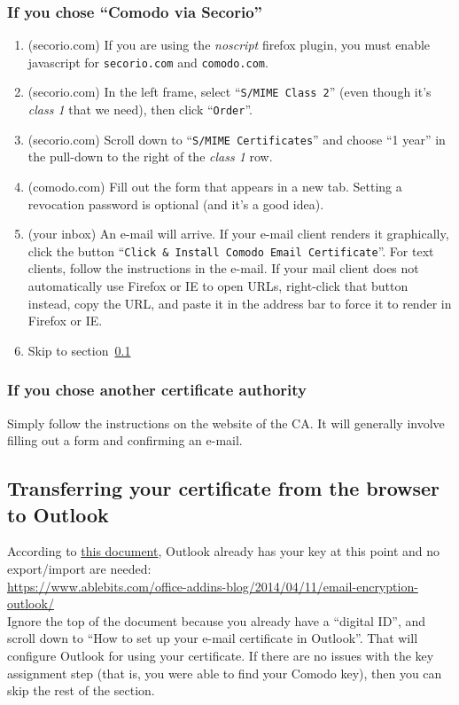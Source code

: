 \documentclass[pdftex,12pt,titlepage=false]{scrartcl}
\begin{document}
\subsubsection{If you chose ``Comodo via Secorio''}
\begin{multicols}{2}
  \begin{enumerate}
  \item (secorio.com) If you are using the \emph{noscript} firefox
    plugin, you must enable javascript for \texttt{secorio.com} and
    \texttt{comodo.com}.
  \item (secorio.com) In the left frame, select ``\texttt{S/MIME Class
      2}'' (even though it's \emph{class 1} that we need), then click
    ``\texttt{Order}''.
  \item (secorio.com) Scroll down to ``\texttt{S/MIME Certificates}''
    and choose ``1 year'' in the pull-down to the right of the
    \emph{class 1} row.
  \item (comodo.com) Fill out the form that appears in a new tab.
    Setting a revocation password is optional (and it's a good
    idea).%
  \item (your inbox) An e-mail will arrive.  If your e-mail client
    renders it graphically, click the button ``\texttt{Click \&
      Install Comodo Email Certificate}''.  For text clients, follow
    the instructions in the e-mail.  If your mail client does not
    automatically use Firefox or IE to open URLs, right-click that
    button instead, copy the URL, and paste it in the address bar to
    force it to render in Firefox or IE.
  \item Skip to section~\ref{browser_export}
  \end{enumerate}
\end{multicols}

\subsubsection{If you chose another certificate authority}
Simply follow the instructions on the website of the CA.  It will
generally involve filling out a form and confirming an e-mail.

\subsection{Transferring your certificate from the browser to Outlook}\label{browser_export}

According to
\href{https://www.ablebits.com/office-addins-blog/2014/04/11/email-encryption-outlook/}{this
  document}, Outlook already has your key at this point and no export/import are needed:\\
\url{https://www.ablebits.com/office-addins-blog/2014/04/11/email-encryption-outlook/}\\
Ignore the top of the document because you already have a ``digital
ID'', and scroll down to ``How to set up your e-mail certificate in
Outlook''.  That will configure Outlook for using your certificate.
If there are no issues with the key assignment step (that is, you were
able to find your Comodo key), then you can skip the rest of the
section.
\end{document}
